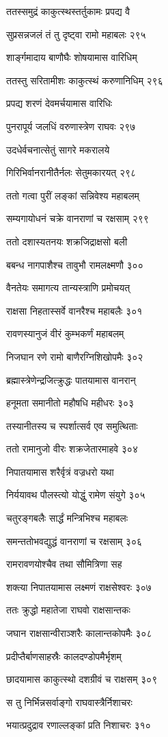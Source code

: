 ततस्समुद्रं काकुत्स्थस्तर्तुकामः प्रपद्य वै

सुप्रसन्नजलं तं तु दृष्ट्वा रामो महाबलः २९५

शार्ङ्गमादाय बाणौघैः शोषयामास वारिधिम्

ततस्तु सरितामीशः काकुत्स्थं करुणानिधिम् २९६

प्रपद्य शरणं देवमर्चयामास वारिधिः

पुनरापूर्य जलधिं वरुणास्त्रेण राघवः २९७

उदधेर्वचनात्सेतुं सागरे मकरालये

गिरिभिर्वानरानीतैर्नलः सेतुमकारयत् २९८

ततो गत्वा पुरीं लङ्कां सन्निवेश्य महाबलम्

सम्यगायोधनं चक्रे वानराणां च रक्षसाम् २९९

ततो दशास्यतनयः शक्रजिद्राक्षसो बली

बबन्ध नागपाशैश्च तावुभौ रामलक्ष्मणौ ३००

वैनतेयः समागत्य तान्यस्त्राणि प्रमोचयत्

राक्षसा निहतास्सर्वे वानरैश्च महाबलैः ३०१

रावणस्यानुजं वीरं कुम्भकर्णं महाबलम्

निजघान रणे रामो बाणैरग्निशिखोपमैः ३०२

ब्रह्मास्त्रेणेन्द्रजित्क्रुद्धः पातयामास वानरान्

हनूमता समानीतो महौषधि महीधरः ३०३

तस्यानीतस्य च स्पर्शात्सर्व एव समुत्थिताः

ततो रामानुजो वीरः शक्रजेतारमाहवे ३०४

निपातयामास शरैर्वृत्रं वज्रधरो यथा

निर्ययावथ पौलस्त्यो योद्धुं रामेण संयुगे ३०५

चतुरङ्गबलैः सार्द्धं मन्त्रिभिश्च महाबलः

समन्ततोभवद्युद्धं वानराणां च रक्षसाम् ३०६

रामरावणयोश्चैव तथा सौमित्रिणा सह

शक्त्या निपातयामास लक्ष्मणं राक्षसेश्वरः ३०७

ततः क्रुद्धो महातेजा राघवो राक्षसान्तकः

जघान राक्षसान्वीराञ्शरैः कालान्तकोपमैः ३०८

प्रदीप्तैर्बाणसाहस्रैः कालदण्डोपमैर्भृशम्

छादयामास काकुत्स्थो दशग्रीवं च राक्षसम् ३०९

स तु निर्भिन्नसर्वाङ्गो राघवास्त्रैर्निशाचरः

भयात्प्रदुद्राव रणाल्लङ्कां प्रति निशाचरः ३१०

